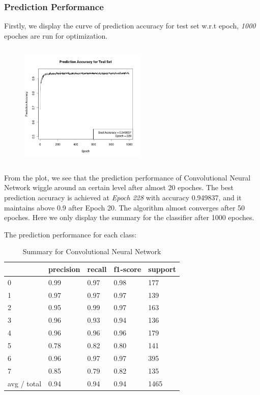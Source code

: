 \documentclass[paper=a4, fontsize=11pt]{scrartcl}
\begin{document}
\newpage
\subsubsection*{Prediction Performance}
Firstly, we display the curve of prediction accuracy for test set w.r.t epoch, \textit{1000} epoches are run for optimization.
\begin{figure}[ht]
\centering
\includegraphics[width=6cm,height=6cm,angle=0]{Rplot.png}
\end{figure}
From the plot, we see that the prediction performance of Convolutional Neural Network wiggle around an certain level after almost 20 epoches. The best prediction accuracy is achieved at \textit{Epoch 228} with accuracy 0.949837, and it maintains above 0.9 after {Epoch 20}. The algorithm almost converges after 50 epoches. Here we only display the summary for the classifier after 1000 epoches.

The prediction performance for each class:
\begin{table}[ht]
\centering
\caption{Summary for Convolutional Neural Network}
\begin{tabular}{lllll}
\hline
            & precision & recall & f1-score & support \\ \hline
0           & 0.99      & 0.97   & 0.98     & 177     \\
1           & 0.97      & 0.97   & 0.97     & 139     \\
2           & 0.95      & 0.99   & 0.97     & 163     \\
3           & 0.96      & 0.93   & 0.94     & 136     \\
4           & 0.96      & 0.96   & 0.96     & 179     \\
5           & 0.78      & 0.82   & 0.80     & 141     \\
6           & 0.96      & 0.97   & 0.97     & 395     \\
7           & 0.85      & 0.79   & 0.82     & 135     \\ \hline
avg / total & 0.94      & 0.94   & 0.94     & 1465    \\ \hline
\end{tabular}
\end{table}
\end{document}
